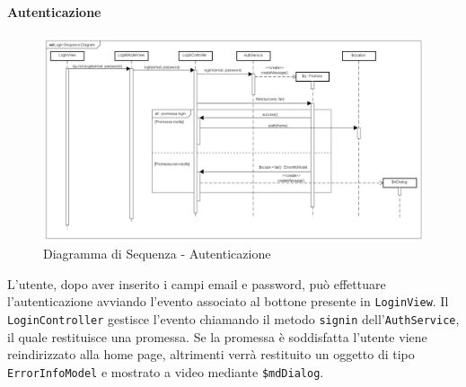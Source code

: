\paragraph{Autenticazione}

\label{Diagramma di Sequenza - Autenticazione}

\begin{figure}[ht]
	\centering
	\includegraphics[scale=0.4,keepaspectratio]{UML/DiagrammiDiSequenza/Front-end/Login.png}
	\caption{Diagramma di Sequenza - Autenticazione}
\end{figure} \FloatBarrier

L'utente, dopo aver inserito i campi email e password, può effettuare l'autenticazione avviando l'evento associato al bottone presente in \texttt{LoginView}. Il \texttt{LoginController} gestisce l'evento chiamando il metodo \texttt{signin} dell'\texttt{AuthService}, il quale restituisce una promessa. Se la promessa è soddisfatta l'utente viene reindirizzato alla home page, altrimenti verrà restituito un oggetto di tipo \texttt{ErrorInfoModel} e mostrato a video mediante \texttt{\$mdDialog}.